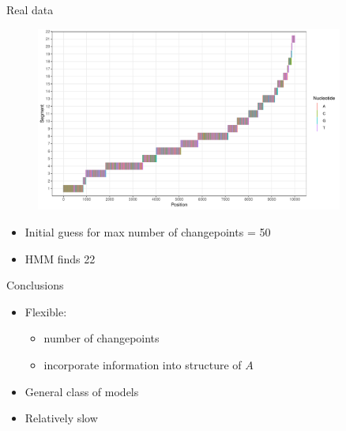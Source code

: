 \documentclass{beamer}
\begin{document}
\begin{frame}{Real data}
\begin{figure}
\includegraphics[width=0.9\textwidth]{fig3.pdf}
\end{figure}
\begin{itemize}
\item Initial guess for max number of changepoints = 50
\item HMM finds 22
\end{itemize}
\end{frame}

\begin{frame}{Conclusions}
\begin{itemize}
\item Flexible:
\begin{itemize}
\item number of changepoints
\item incorporate information into structure of $A$
\end{itemize}
\item General class of models
\item Relatively slow
\end{itemize}
\end{frame}

\end{document}
